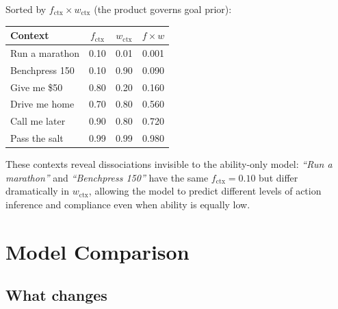 \documentclass[11pt]{article}
\begin{document}
Sorted by $f_{\text{ctx}} \times w_{\text{ctx}}$ (the product governs goal prior):

\begin{center}
\renewcommand{\arraystretch}{1.2}
\begin{tabular}{lccc}
\toprule
\textbf{Context} & $f_{\text{ctx}}$ & $w_{\text{ctx}}$ & $f \times w$ \\
\midrule
Run a marathon   & 0.10 & 0.01 & 0.001 \\
Benchpress 150   & 0.10 & 0.90 & 0.090 \\
Give me \$50     & 0.80 & 0.20 & 0.160 \\
Drive me home    & 0.70 & 0.80 & 0.560 \\
Call me later    & 0.90 & 0.80 & 0.720 \\
Pass the salt    & 0.99 & 0.99 & 0.980 \\
\bottomrule
\end{tabular}
\end{center}

These contexts reveal dissociations invisible to the ability-only model:
\emph{``Run a marathon''} and \emph{``Benchpress 150''} have the same $f_{\text{ctx}} = 0.10$
but differ dramatically in $w_{\text{ctx}}$, allowing the model to predict
different levels of action inference and compliance even when ability is equally
low.

\section{Model Comparison}
\label{sec:comparison}

\subsection{What changes}
\end{document}

